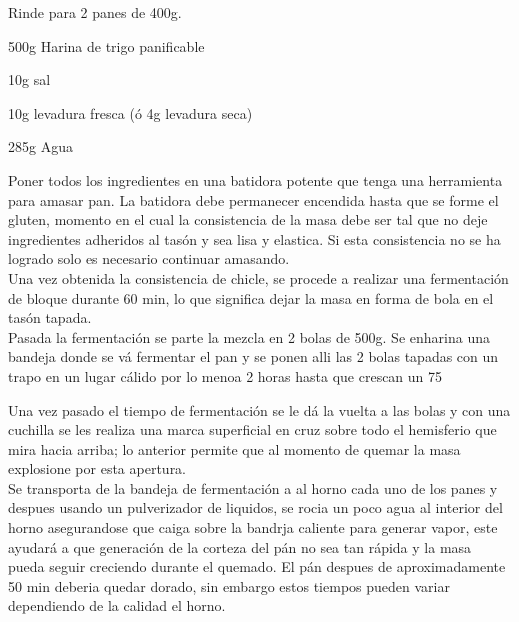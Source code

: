 
Rinde para 2 panes de 400g.

\begin{ingredientes}
\item 500g Harina de trigo panificable
\item 10g sal
\item 10g levadura fresca (ó 4g levadura seca)
\item 285g Agua
\end{ingredientes}
\preparacion
Poner todos los ingredientes en una batidora potente que tenga una herramienta para amasar pan. La batidora debe permanecer encendida hasta que se forme el gluten, momento en el cual la consistencia de la masa debe ser tal que no deje ingredientes adheridos al tasón y sea lisa y elastica. Si esta consistencia no se ha logrado solo es necesario continuar amasando.\\

Una vez obtenida la consistencia de chicle, se procede a realizar una fermentación de bloque durante 60 min, lo que significa dejar la masa en forma de bola en el tasón tapada.\\

Pasada la fermentación se parte la mezcla en 2 bolas de 500g. Se enharina una bandeja donde se vá fermentar el pan y se ponen alli las 2 bolas tapadas con un trapo en un lugar cálido por lo menoa 2 horas hasta que crescan un 75%


Una vez pasado el tiempo de fermentación se le dá la vuelta a las bolas y con una cuchilla se les realiza una marca superficial en cruz sobre todo el hemisferio que mira hacia arriba; lo anterior permite que al momento de quemar la masa explosione por esta apertura.\\

Se transporta de la bandeja de fermentación a al horno cada uno de los  panes y despues usando un pulverizador de liquidos, se rocia un poco agua al interior del horno asegurandose que caiga sobre la bandrja caliente para generar vapor, este ayudará a que generación de la corteza del pán no sea tan rápida y la masa pueda seguir creciendo durante el quemado. El pán despues de aproximadamente 50 min deberia quedar dorado, sin embargo estos tiempos pueden variar dependiendo de la calidad el horno.\\

